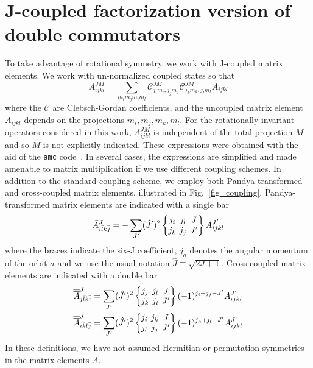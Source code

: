 \documentclass[11pt]{article}
\newcommand{\sixj}[6]{\begingroup\setlength{\arraycolsep}{0.2em}\begin{Bmatrix} #1 & #2 & #3 \\ #4 & #5 & #6 \end{Bmatrix}\endgroup}
\begin{document}
\section{J-coupled factorization version of double commutators}
\label{section::Jscheme_factorizedDCs}
To take advantage of rotational symmetry, we work with J-coupled matrix elements.
We work with un-normalized coupled states so that
\begin{equation}
    A_{ijkl}^{JM} = \sum_{m_im_jm_im_l} \mathcal{C}^{JM}_{j_im_i,j_jm_j}
     \mathcal{C}^{JM}_{j_km_k,j_lm_l}
    A_{ijkl}
\end{equation}
where the $\mathcal{C}$ are Clebsch-Gordan coefficients, and the uncoupled matrix element $A_{ijkl}$ depends on the projections $m_i,m_j,m_k,m_l$.
For the rotationally invariant operators considered in this work, $A^{JM}_{ijkl}$ is independent of the total projection $M$ and so $M$ is not explicitly indicated.
These expressions were obtained with the aid of the \texttt{amc} code~\cite{Tichai2020}.
In several cases, the expressions are simplified and made amenable to matrix multiplication if we use different coupling schemes.
In addition to the standard coupling scheme, we employ both Pandya-transformed and cross-coupled matrix elements, illustrated in Fig.~\ref{fig_coupling}.
Pandya-transformed matrix elements are indicated with a single bar
\begin{align} \label{Pandya}
\bar A^J_{i \bar l k \bar j} = - \sum_{J^\prime} (\hat{J}^\prime)^2 \sixj{{j}_{i}}{{j}_{l}}{{J}}{{j}_{k}}{{j}_{j}}{{J}^\prime}  A^{J^\prime}_{i j k l} 
\end{align}
where the braces indicate the six-J coefficient,
$j_a$ denotes the angular momentum of the orbit $a$
and we use the usual notation $\hat J \equiv \sqrt{2J+1}$.
Cross-coupled matrix elements are indicated with a double bar
\begin{align} \label{cross-coupled_Pandya}
 \overline{\overline{A}}^J_{j \bar l k \bar i} &= \sum_{J^\prime} (\hat{J}^\prime)^2 \sixj{{j}_{j}}{{j}_{l}}{{J}}{{j}_{k}}{{j}_{i}}{{J}^\prime}  (-1)^{j_i +j_j -J^\prime}   A^{J^\prime}_{i j k l} \nonumber \\
 \overline{\overline{A}}^J_{i \bar k l \bar j} &= \sum_{J^\prime} (\hat{J}^\prime)^2 \sixj{{j}_{i}}{{j}_{k}}{{J}}{{j}_{l}}{{j}_{j}}{{J}^\prime}  (-1)^{j_k +j_l -J^\prime}   A^{J^\prime}_{i j k l} 
\end{align}
In these definitions, we have not assumed Hermitian or permutation symmetries in the matrix elements $A$.
\end{document}
